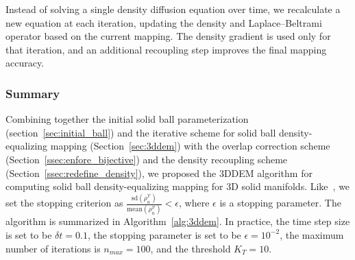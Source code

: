 \documentclass{article}
\begin{document}
Instead of solving a single density diffusion equation over time, we recalculate a new equation at each iteration, updating the density and Laplace–Beltrami operator based on the current mapping. The density gradient is used only for that iteration, and an additional recoupling step improves the final mapping accuracy.


\subsubsection{Summary}
Combining together the initial solid ball parameterization (section~\ref{sec:initial_ball}) and the iterative scheme for solid ball density-equalizing mapping (Section~\ref{sec:3ddem}) with the overlap correction scheme (Section~\ref{ssec:enfore_bijective}) and the density recoupling scheme (Section~\ref{ssec:redefine_density}), we proposed the 3DDEM algorithm for computing solid ball density-equalizing mapping for 3D solid manifolds. Like~\cite{lyu2024spherical}, we set the stopping criterion as $\frac{\text{sd}(\rho_n^\mathcal{V})}{\text{mean}(\rho_n^\mathcal{V})} < \epsilon$, where $\epsilon$ is a stopping parameter. The algorithm is summarized in Algorithm~\ref{alg:3ddem}. In practice, the time step size is set to be $\delta t = 0.1$, the stopping parameter is set to be $\epsilon = 10^{-2}$, the maximum number of iterations is $n_{max} = 100$, and the threshold $K_T = 10$.
\end{document}
